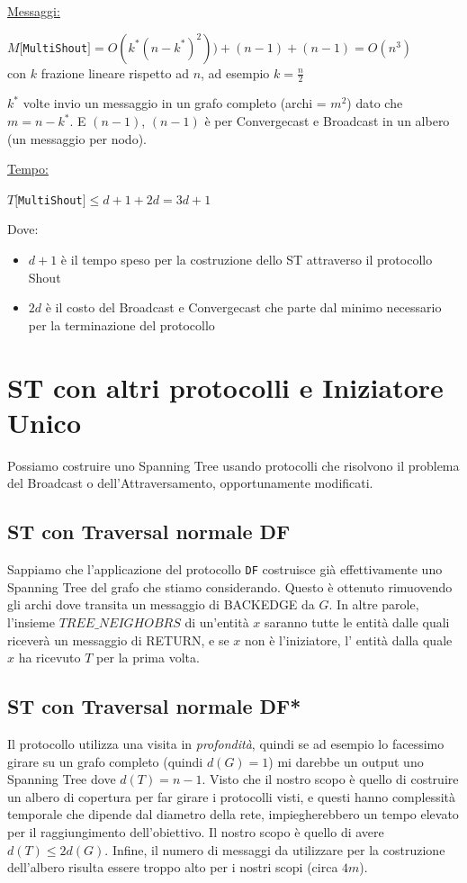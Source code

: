 \underline{Messaggi:}
\begin{center}
    $M[$\texttt{MultiShout}$] = O(k^*(n-k^*)^2)) + (n-1)+ (n-1) = O(n^3)$\\
    con $k$ frazione lineare rispetto ad $n$, ad esempio $k=\frac{n}{2}$
\end{center}
$k^*$ volte invio un messaggio in un grafo completo (archi = $m^2$) dato che
$m=n-k^*$. E $(n-1)$, $(n-1)$ è per Convergecast e Broadcast in un albero (un
messaggio per nodo).

\underline{Tempo:}
\begin{center}
    $T[$\texttt{MultiShout}$] \leq d + 1 + 2d = 3d + 1$
\end{center}
Dove:
\begin{itemize}
    \item  $d+1$ è il tempo speso per la costruzione dello ST attraverso il
          protocollo Shout
    \item $2d$ è il costo del Broadcast e Convergecast che parte dal minimo
          necessario per la terminazione del protocollo
\end{itemize}

\section{ST con altri protocolli e Iniziatore Unico}
Possiamo costruire uno Spanning Tree usando protocolli che risolvono il problema
del Broadcast o dell'Attraversamento, opportunamente modificati.

\subsection{ST con Traversal normale DF}
Sappiamo che l'applicazione del protocollo \texttt{DF} costruisce già effettivamente
uno Spanning Tree del grafo che stiamo considerando. Questo è ottenuto
rimuovendo gli archi dove transita un messaggio di BACKEDGE da $G$. In altre
parole, l'insieme $TREE\_NEIGHOBRS$ di un'entità $x$ saranno tutte le entità dalle
quali riceverà un messaggio di RETURN, e se $x$ non è l'iniziatore, l' entità
dalla quale $x$ ha ricevuto $T$ per la prima volta.

\subsection{ST con Traversal normale DF*}
Il protocollo utilizza una visita in \textit{profondità}, quindi se ad esempio
lo facessimo girare su un grafo completo (quindi $d(G)=1$) mi darebbe un output
uno Spanning Tree dove $d(T) = n-1$. Visto che il nostro scopo è quello di
costruire un albero di copertura per far girare i protocolli visti, e questi
hanno complessità temporale che dipende dal diametro della rete, impiegherebbero
un tempo elevato per il raggiungimento dell'obiettivo. Il nostro scopo è quello
di avere $d(T) \leq 2d(G)$. Infine, il numero di messaggi da utilizzare per la
costruzione dell'albero risulta essere troppo alto per i nostri scopi (circa
$4m$).

